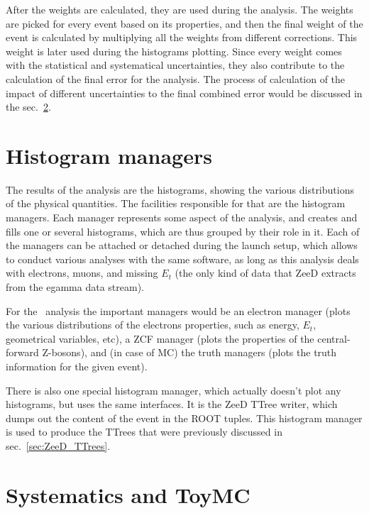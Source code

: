 After the weights are calculated, they are used during the analysis. The weights are picked for every event based on its properties, and then the final weight of the event is calculated by multiplying all the weights from different corrections. This weight is later used during the histograms plotting. Since every weight comes with the statistical and systematical uncertainties, they also contribute to the calculation of the final error for the analysis. The process of calculation of the impact of different uncertainties to the final combined error would be discussed in the sec.~\ref{sec:ZeeD_toymc}.

\section{Histogram managers}

The results of the analysis are the histograms, showing the various distributions of the physical quantities. The facilities responsible for that are the histogram managers. Each manager represents some aspect of the analysis, and creates and fills one or several histograms, which are thus grouped by their role in it. Each of the managers can be attached or detached during the launch setup, which allows to conduct various analyses with the same software, as long as this analysis deals with electrons, muons, and missing $E_{t}$ (the only kind of data that ZeeD extracts from the egamma data stream).

For the \Zee\ analysis the important managers would be an electron manager (plots the various distributions of the electrons properties, such as energy, $E_{t}$, geometrical variables, etc), a ZCF manager (plots the properties of the central-forward Z-bosons), and (in case of MC) the truth managers (plots the truth information for the given event).

There is also one special histogram manager, which actually doesn't plot any histograms, but uses the same interfaces. It is the ZeeD TTree writer, which dumps out the content of the event in the ROOT tuples. This histogram manager is used to produce the TTrees that were previously discussed in sec.~\ref{sec:ZeeD_TTrees}.

\section{Systematics and ToyMC}
\label{sec:ZeeD_toymc}

